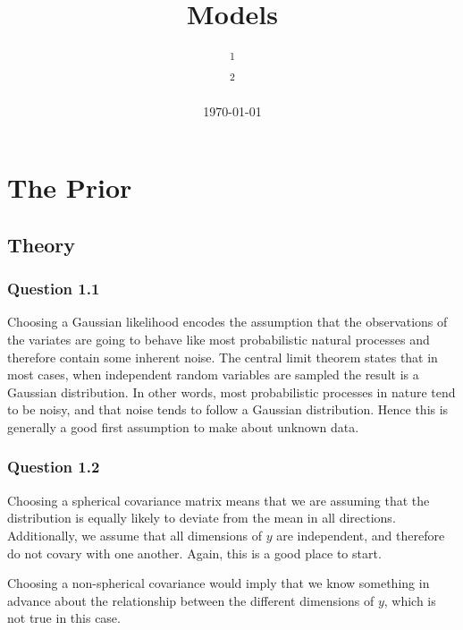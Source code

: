 \documentclass[10pt, a4paper, twocolumn]{article} %
\title{Models} %
\author{
	\authorstyle{Justin Salmon\textsuperscript{1} and George Lancaster\textsuperscript{2}} %
	\newline\newline %
	\textsuperscript{1}\institution{wr18313}\\ %
	\textsuperscript{2}\institution{qv18258} %
}
\date{\today} %
\begin{document}
\maketitle %

\thispagestyle{firstpage} %




\section{The Prior}

\subsection{Theory}

\subsubsection*{Question 1.1}
Choosing a Gaussian likelihood encodes the assumption that the observations of the variates are going to behave like most probabilistic natural processes and therefore contain some inherent noise. The central limit theorem states that in most cases, when independent random variables are sampled the result is a Gaussian distribution. In other words, most probabilistic processes in nature tend to be noisy, and that noise tends to follow a Gaussian distribution. Hence this is generally a good first assumption to make about unknown data.
\subsubsection*{Question 1.2}
Choosing a spherical covariance matrix means that we are assuming that the distribution is equally likely to deviate from the mean in all directions. Additionally, we assume that all dimensions of $y$ are independent, and therefore do not covary with one another. Again, this is a good place to start. \par
Choosing a non-spherical covariance would imply that we know something in advance about the relationship between the different dimensions of $y$, which is not true in this case.
\end{document}
